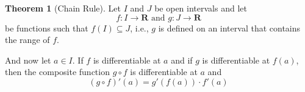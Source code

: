 \documentclass[12pt,a4paper]{article}
\theoremstyle{definition}
\newtheorem{theorem}{Theorem}[section]
\newtheorem{definition}{Definition}[section]
\begin{document}
\begin{theorem}[Chain Rule]
	Let $I$ and $J$ be open intervals and let
	\[
		f : I \longrightarrow \textbf{R} \text{ and } g : J \longrightarrow \textbf{R}
	\]
	be functions such that $f(I) \subseteq J$, i.e., $g$ is defined on an interval that contains the range of $f$. 

	And now let $a \in I$. If $f$ is differentiable at $a$ and if $g$ is differentiable at $f(a)$, then the composite function $g \circ f$ is differentiable at $a$ and
	\[
		(g \circ f)'(a) = g'(f(a)) \cdot f'(a)
	\]
\end{theorem}

\newpage
\nocite{*}



%
%
%
%
%
%
%
%
\end{document}
